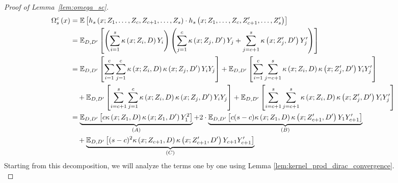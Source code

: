 \begin{proof}[Proof of Lemma~\ref{lem:omega_sc}]
	\begin{equation}
		\begin{aligned}
			\Omega_{s}^{c}\left(x\right)
			 & = \mathbb{E}\left[h_{s}\left(x; Z_1, \ldots, Z_{c}, Z_{c+1}, \ldots, Z_{s}\right) \cdot
			h_{s}\left(x; Z_1, \ldots,Z_{c}, Z_{c+1}^{\prime}, \ldots, Z_{s}^{\prime}\right)\right]                                                                \\
			 & = \mathbb{E}_{D, D^{\prime}}\left[
				\left(\sum_{i = 1}^{s}\kappa\left(x; Z_{i}, D\right)Y_{i}\right)
				\left(\sum_{j = 1}^{c}\kappa\left(x; Z_{j}, D^{\prime}\right)Y_{j}
				+ \sum_{j = c+1}^{s}\kappa\left(x; Z_{j}^{\prime}, D^{\prime}\right)Y_{j}^{\prime}\right)
			\right]                                                                                                                                                                                             \\
			 & = \mathbb{E}_{D, D^{\prime}}\left[\sum_{i = 1}^{c}\sum_{j = 1}^{c}\kappa\left(x; Z_{i}, D\right)\kappa\left(x; Z_{j}, D^{\prime}\right)Y_{i}Y_{j}\right]
			+  \mathbb{E}_{D, D^{\prime}}\left[\sum_{i = 1}^{c}\sum_{j = c+1}^{s}\kappa\left(x; Z_{i}, D\right)\kappa\left(x; Z_{j}^{\prime}, D^{\prime}\right)Y_{i}Y_{j}^{\prime}\right]   \\
			 & \quad + \mathbb{E}_{D, D^{\prime}}\left[\sum_{i = c+1}^{s}\sum_{j = 1}^{c}\kappa\left(x; Z_{i}, D\right)\kappa\left(x; Z_{j}, D^{\prime}\right)Y_{i}Y_{j}\right]
			+  \mathbb{E}_{D, D^{\prime}}\left[\sum_{i = c+1}^{s}\sum_{j = c+1}^{s}\kappa\left(x; Z_{i}, D\right)\kappa\left(x; Z_{j}^{\prime}, D^{\prime}\right)Y_{i}Y_{j}^{\prime}\right] \\
			 & = \underbrace{\mathbb{E}_{D, D^{\prime}}\left[c \kappa\left(x; Z_{1}, D\right)\kappa\left(x; Z_{1}, D^{\prime}\right)Y_{1}^{2}\right]}_{(A)}
			+ 2 \cdot \underbrace{\mathbb{E}_{D, D^{\prime}}\left[c(s-c) \kappa\left(x; Z_{1}, D\right)\kappa\left(x; Z_{c+1}^{\prime}, D^{\prime}\right)Y_{1}Y_{c+1}^{\prime}\right]}_{(B)}                                   \\
			 & \quad + \underbrace{\mathbb{E}_{D, D^{\prime}}\left[(s-c)^2 \kappa\left(x; Z_{c+1}, D\right)\kappa\left(x; Z_{c+1}^{\prime}, D^{\prime}\right)Y_{c+1}Y_{c+1}^{\prime}\right]}_{(C)}
		\end{aligned}
	\end{equation}
	Starting from this decomposition, we will analyze the terms one by one using Lemma \ref{lem:kernel_prod_dirac_convergence}.
	\begin{equation}

\end{equation}
\end{proof}
